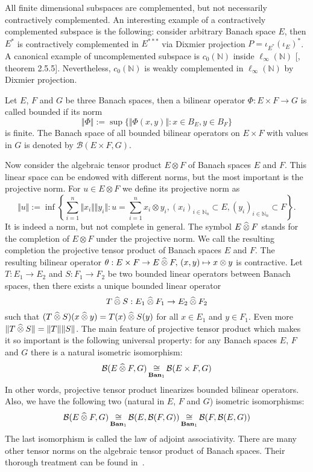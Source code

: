 All finite dimensional subspaces are complemented, but not necessarily
contractively complemented. An interesting example of a contractively 
complemented subspace is the following: consider arbitrary Banach space $E$, 
then $E^*$ is contractively complemented in $E^{***}$ via Dixmier 
projection $P=\iota_{E^*}{(\iota_E)}^*$. A canonical example of uncomplemented 
subspace is $c_0(\mathbb{N})$ 
inside $\mathbb{\ell_\infty}(\mathbb{N})$ [\cite{KalAlbTopicsBanSpTh}, theorem 2.5.5].
Nevertheless, $c_0(\mathbb{N})$ is weakly complemented in
$\ell_\infty(\mathbb{N})$ by Dixmier projection.

Let $E$, $F$ and $G$ be three Banach spaces, then a bilinear operator
$\Phi:E\times F\to G$ is called bounded if its norm 
$$
\Vert \Phi\Vert:=\sup \{\Vert \Phi(x,y)\Vert:x\in B_E, y\in B_F \}
$$ 
is finite. 
The Banach space of all bounded bilinear operators on $E\times F$ with 
values in $G$ is denoted by $\mathcal{B}(E\times F,G)$.

Now consider the algebraic tensor product $E\otimes F$ of Banach spaces $E$ and
$F$. This linear space can be endowed with different norms, but the most
important is the projective norm. For $u\in E\otimes F$ we define its projective
norm as
$$
\Vert u\Vert
:=\inf\left \{
  \sum_{i=1}^n \Vert x_i\Vert\Vert y_i\Vert
  :u=\sum_{i=1}^n x_i\otimes y_i, 
  {(x_i)}_{i\in\mathbb{N}_n}\subset E, 
  {(y_i)}_{i\in\mathbb{N}_n}\subset F
\right \}.
$$
It is indeed a norm, but not complete in general. The symbol $E\mathbin{\widehat{\otimes}} F$
stands for the completion of $E\otimes F$ under the projective norm. We call the
resulting completion the projective tensor product of Banach spaces $E$ and $F$.
The resulting bilinear operator 
$\theta:E\times F\to E\mathbin{\widehat{\otimes}} F,\,(x,y)\mapsto x\otimes y$ is contractive.
Let $T:E_1\to E_2$ and $S:F_1\to F_2$ be two bounded linear operators between
Banach spaces, then there exists a unique bounded linear operator 
$$
T\mathbin{\widehat{\otimes}} S:E_1\mathbin{\widehat{\otimes}} F_1\to E_2\mathbin{\widehat{\otimes}} F_2
$$ 
such that  $(T\mathbin{\widehat{\otimes}} S)(x\mathbin{\widehat{\otimes}} y)=T(x)\mathbin{\widehat{\otimes}} S(y)$ 
for all $x\in E_1$ and $y\in F_1$. 
Even more $\Vert T\mathbin{\widehat{\otimes}} S\Vert=\Vert T\Vert\Vert S\Vert$. The main feature 
of projective tensor product which makes it so important is the following 
universal property: for any Banach spaces $E$, $F$ and $G$ there is a 
natural isometric isomorphism:
$$
\mathcal{B}(E\mathbin{\widehat{\otimes}} F,G)\mathop{\mathbin{\cong}}\limits_{\mathbf{Ban}_1}\mathcal{B}(E\times F,G)
$$
In other words, projective tensor product linearizes bounded bilinear operators.
Also, we have the following two (natural in $E$, $F$ and $G$) isometric
isomorphisms:
$$
\mathcal{B}(E\mathbin{\widehat{\otimes}} F,G)
\mathop{\mathbin{\cong}}\limits_{\mathbf{Ban}_1}\mathcal{B}(E,\mathcal{B}(F,G))
\mathop{\mathbin{\cong}}\limits_{\mathbf{Ban}_1}\mathcal{B}(F,\mathcal{B}(E,G))
$$
The last isomorphism is called the law of adjoint associativity. There are many
other tensor norms on the algebraic tensor product of Banach spaces. Their
thorough treatment can be found in~\cite{DiestMetTheoryOfTensProd}.

